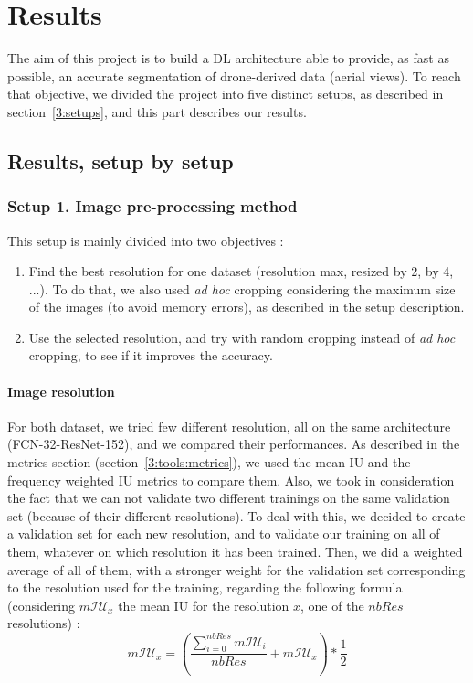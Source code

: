 \chapter{Results}


The aim of this project is to build a DL architecture able to provide, as fast as possible, an accurate segmentation of drone-derived data (aerial views). To reach that objective, we divided the project into five distinct setups, as described in section~\ref{3:setups}, and this part describes our results.



\section{Results, setup by setup} \label{4:setups}
\subsection*{Setup 1. Image pre-processing method}
This setup is mainly divided into two objectives :
\begin{enumerate}
\item Find the best resolution for one dataset (resolution max, resized by 2, by 4, ...). To do that, we also used \textit{ad hoc} cropping considering the maximum size of the images (to avoid memory errors), as described in the setup description.
\item Use the selected resolution, and try with random cropping instead of \textit{ad hoc} cropping, to see if it improves the accuracy.
\end{enumerate}

\subsubsection{Image resolution}
For both dataset, we tried few different resolution, all on the same architecture (FCN-32-ResNet-152), and we compared their performances. As described in the metrics section (section~\ref{3:tools:metrics}), we used the mean IU and the frequency weighted IU metrics to compare them. Also, we took in consideration the fact that we can not validate two different trainings on the same validation set (because of their different resolutions). To deal with this, we decided to create a validation set for each new resolution, and to validate our training on all of them, whatever on which resolution it has been trained. Then, we did a weighted average of all of them, with a stronger weight for the validation set corresponding to the resolution used for the training, regarding the following formula (considering $m\mathcal{IU}_x$ the mean IU for the resolution $x$, one of the $nbRes$ resolutions) :
$$m\mathcal{IU}_x = (\frac{\sum_{i = 0}^{nbRes} m\mathcal{IU}_i}{nbRes} + m\mathcal{IU}_x) * \frac{1}{2} $$

